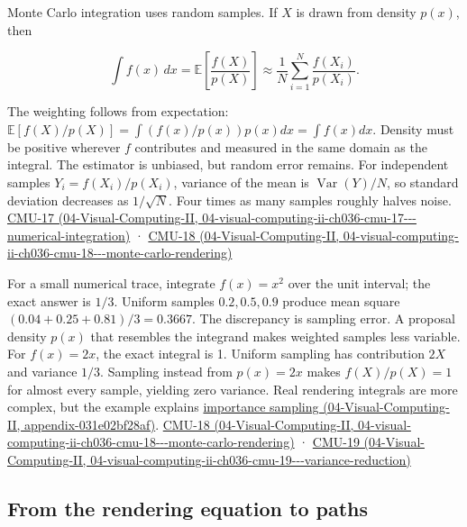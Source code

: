 Monte Carlo integration uses random samples. If \(X\) is drawn from density \(p(x)\), then

\[
\int f(x)\,dx=\mathbb E\left[\frac{f(X)}{p(X)}\right]\approx\frac1N\sum_{i=1}^N\frac{f(X_i)}{p(X_i)}.
\]

The weighting follows from expectation: \(\mathbb E[f(X)/p(X)]=\int (f(x)/p(x))p(x)dx=\int f(x)dx\). Density must be positive wherever \(f\) contributes and measured in the same domain as the integral. The estimator is unbiased, but random error remains. For independent samples \(Y_i=f(X_i)/p(X_i)\), variance of the mean is \(\operatorname{Var}(Y)/N\), so standard deviation decreases as \(1/\sqrt N\). Four times as many samples roughly halves noise. \href{../04-Visual-Computing-II/main.pdf\#nameddest=04-visual-computing-ii-ch036-cmu-17---numerical-integration}{CMU-17 (04-Visual-Computing-II, 04-visual-computing-ii-ch036-cmu-17-\/-\/-numerical-integration)} · \href{../04-Visual-Computing-II/main.pdf\#nameddest=04-visual-computing-ii-ch036-cmu-18---monte-carlo-rendering}{CMU-18 (04-Visual-Computing-II, 04-visual-computing-ii-ch036-cmu-18-\/-\/-monte-carlo-rendering)}

For a small numerical trace, integrate \(f(x)=x^2\) over the unit interval; the exact answer is \(1/3\). Uniform samples \(0.2,0.5,0.9\) produce mean square \((0.04+0.25+0.81)/3=0.3667\). The discrepancy is sampling error. A proposal density \(p(x)\) that resembles the integrand makes weighted samples less variable. For \(f(x)=2x\), the exact integral is 1. Uniform sampling has contribution \(2X\) and variance \(1/3\). Sampling instead from \(p(x)=2x\) makes \(f(X)/p(X)=1\) for almost every sample, yielding zero variance. Real rendering integrals are more complex, but the example explains \href{../04-Visual-Computing-II/main.pdf\#nameddest=appendix-031e02bf28af}{importance sampling (04-Visual-Computing-II, appendix-031e02bf28af)}. \href{../04-Visual-Computing-II/main.pdf\#nameddest=04-visual-computing-ii-ch036-cmu-18---monte-carlo-rendering}{CMU-18 (04-Visual-Computing-II, 04-visual-computing-ii-ch036-cmu-18-\/-\/-monte-carlo-rendering)} · \href{../04-Visual-Computing-II/main.pdf\#nameddest=04-visual-computing-ii-ch036-cmu-19---variance-reduction}{CMU-19 (04-Visual-Computing-II, 04-visual-computing-ii-ch036-cmu-19-\/-\/-variance-reduction)}

\subsection{From the rendering equation to paths}\label{03-visual-computing-i-ch011-from-the-rendering-equation-to-paths}

